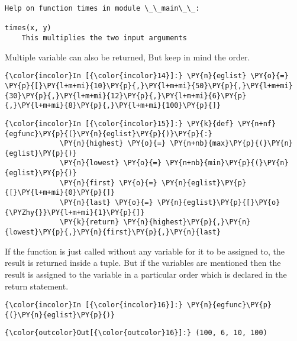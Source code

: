     \begin{Verbatim}[commandchars=\\\{\}]
Help on function times in module \_\_main\_\_:

times(x, y)
    This multiplies the two input arguments
    \end{Verbatim}

    Multiple variable can also be returned, But keep in mind the order.

    \begin{Verbatim}[commandchars=\\\{\}]
{\color{incolor}In [{\color{incolor}14}]:} \PY{n}{eglist} \PY{o}{=} \PY{p}{[}\PY{l+m+mi}{10}\PY{p}{,}\PY{l+m+mi}{50}\PY{p}{,}\PY{l+m+mi}{30}\PY{p}{,}\PY{l+m+mi}{12}\PY{p}{,}\PY{l+m+mi}{6}\PY{p}{,}\PY{l+m+mi}{8}\PY{p}{,}\PY{l+m+mi}{100}\PY{p}{]}
\end{Verbatim}

    \begin{Verbatim}[commandchars=\\\{\}]
{\color{incolor}In [{\color{incolor}15}]:} \PY{k}{def} \PY{n+nf}{egfunc}\PY{p}{(}\PY{n}{eglist}\PY{p}{)}\PY{p}{:}
             \PY{n}{highest} \PY{o}{=} \PY{n+nb}{max}\PY{p}{(}\PY{n}{eglist}\PY{p}{)}
             \PY{n}{lowest} \PY{o}{=} \PY{n+nb}{min}\PY{p}{(}\PY{n}{eglist}\PY{p}{)}
             \PY{n}{first} \PY{o}{=} \PY{n}{eglist}\PY{p}{[}\PY{l+m+mi}{0}\PY{p}{]}
             \PY{n}{last} \PY{o}{=} \PY{n}{eglist}\PY{p}{[}\PY{o}{\PYZhy{}}\PY{l+m+mi}{1}\PY{p}{]}
             \PY{k}{return} \PY{n}{highest}\PY{p}{,}\PY{n}{lowest}\PY{p}{,}\PY{n}{first}\PY{p}{,}\PY{n}{last}
\end{Verbatim}

    If the function is just called without any variable for it to be
assigned to, the result is returned inside a tuple. But if the variables
are mentioned then the result is assigned to the variable in a
particular order which is declared in the return statement.

    \begin{Verbatim}[commandchars=\\\{\}]
{\color{incolor}In [{\color{incolor}16}]:} \PY{n}{egfunc}\PY{p}{(}\PY{n}{eglist}\PY{p}{)}
\end{Verbatim}

            \begin{Verbatim}[commandchars=\\\{\}]
{\color{outcolor}Out[{\color{outcolor}16}]:} (100, 6, 10, 100)
\end{Verbatim}
        

